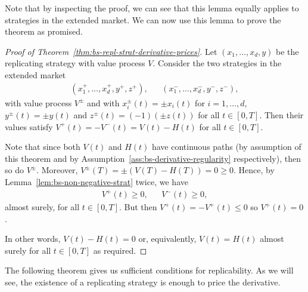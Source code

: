 \documentclass[english]{article}
\numberwithin{equation}{section}
\numberwithin{figure}{section}
\theoremstyle{bolddescit}
\theoremstyle{definition}
\theoremstyle{definition}
\theoremstyle{plain}
\theoremstyle{plain}
\theoremstyle{bolddesc}
\theoremstyle{plain}
\theoremstyle{remark}
\begin{document}
Note that by inspecting the proof, we can see that this lemma equally applies to strategies in the extended market. We can now use this lemma to prove the theorem as promised.

\begin{proof}[Proof of Theorem~\ref{thm:bs-repl-strat-derivative-prices}]
  Let $(x_1,\ldots,x_d,y)$ be the replicating strategy with value process $V$. Consider the two strategies in the extended market
  \begin{align*}
    (x_1^+,\ldots,x_d^+,y^+,z^+), && (x_1^-,\ldots,x_d^-,y^-,z^-),
  \end{align*}
  with value process $V^\pm$ and with $x_i^\pm(t) = \pm x_i(t)$ for $i=1,\ldots,d$, $y^\pm(t) = \pm y(t)$ and $z^\pm(t) = (-1) (\pm z(t))$ for all $t \in [0,T]$.  Then their values satisfy $V^+(t) = - V^-(t) = V(t) - H(t)$ for all $t \in [0,T]$.

  Note that since both $V(t)$ and $H(t)$ have continuous paths (by assumption of this theorem and by Assumption~\ref{ass:bs-derivative-regularity} respectively), then so do $V^\pm$. Moreover, $V^\pm(T) = \pm (V(T) - H(T)) = 0 \ge 0$. Hence, by Lemma~\ref{lem:bs-non-negative-strat} twice, we have
  \begin{align*}
    V^+(t) \ge 0, && V^-(t) \ge 0,
  \end{align*}
  almost surely, for all $t \in [0,T]$. But then $V^+(t) = - V^+(t) \le 0$ so $V^+(t) = 0$.

  In other words, $V(t) - H(t) = 0$ or, equivalently, $V(t) = H(t)$ almost surely for all $t \in [0,T]$ as required.
\end{proof}

The following theorem gives us sufficient conditions for replicability. As we will see, the existence of a replicating strategy is enough to price the derivative.
\end{document}
